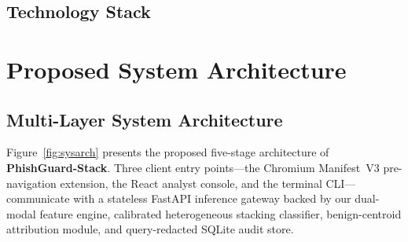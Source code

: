 \documentclass[12pt,a4paper]{report}
\begin{document}
\section{Technology Stack}
\begin{table}[htbp]
\caption{Implemented Software and Benchmarking Stack}
\label{tab:stack}
\centering
\small
{}
\end{table}

\chapter{Proposed System Architecture}

\section[Multi-Layer System Architecture]{Multi-Layer System Architecture}
Figure~\ref{fig:sysarch} presents the proposed five-stage architecture of \textbf{PhishGuard-Stack}. Three client entry points---the Chromium Manifest~V3 pre-navigation extension, the React analyst console, and the terminal CLI---communicate with a stateless FastAPI inference gateway backed by our dual-modal feature engine, calibrated heterogeneous stacking classifier, benign-centroid attribution module, and query-redacted SQLite audit store.
\end{document}
